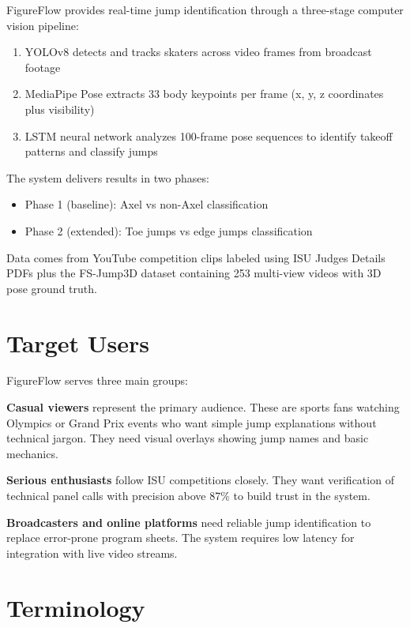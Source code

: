 FigureFlow provides real-time jump identification through a three-stage computer vision pipeline:

\begin{enumerate}
\item YOLOv8 detects and tracks skaters across video frames from broadcast footage
\item MediaPipe Pose extracts 33 body keypoints per frame (x, y, z coordinates plus visibility) 
\item LSTM neural network analyzes 100-frame pose sequences to identify takeoff patterns and classify jumps
\end{enumerate}

The system delivers results in two phases:
\begin{itemize}
\item Phase 1 (baseline): Axel vs non-Axel classification 
\item Phase 2 (extended): Toe jumps vs edge jumps classification 
\end{itemize}

Data comes from YouTube competition clips labeled using ISU Judges Details PDFs plus the FS-Jump3D dataset containing 253 multi-view videos with 3D pose ground truth.

\section{Target Users}
\label{section:target-user}

FigureFlow serves three main groups:

\textbf{Casual viewers} represent the primary audience. These are sports fans watching Olympics or Grand Prix events who want simple jump explanations without technical jargon. They need visual overlays showing jump names and basic mechanics.

\textbf{Serious enthusiasts} follow ISU competitions closely. They want verification of technical panel calls with precision above 87\% to build trust in the system.

\textbf{Broadcasters and online platforms} need reliable jump identification to replace error-prone program sheets. The system requires low latency for integration with live video streams.

\section{Terminology}
\label{section:terminology}

